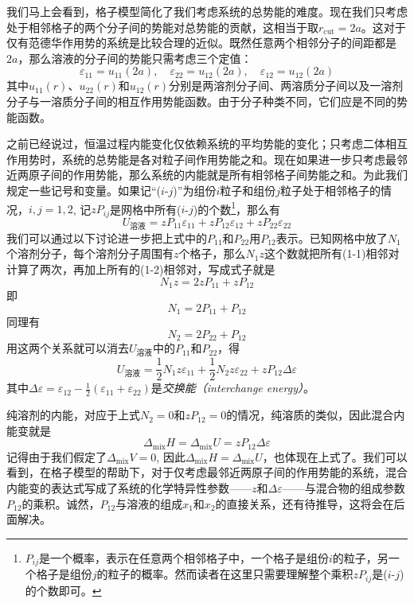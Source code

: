 \documentclass[main.tex]{subfiles}
\begin{document}
我们马上会看到，格子模型简化了我们考虑系统的总势能的难度。现在我们只考虑处于相邻格子的两个分子间的势能对总势能的贡献，这相当于取$r_\text{cut}=2a$。这对于仅有范德华作用势的系统是比较合理的近似。既然任意两个相邻分子的间距都是$2a$，那么溶液的分子间的势能只需考虑三个定值：
\[\varepsilon_{11}=u_{11}\left(2a\right),\quad\varepsilon_{22}=u_{12}\left(2a\right),\quad\varepsilon_{12}=u_{12}\left(2a\right)\]
其中$u_{11}\left(r\right)$、$u_{22}\left(r\right)$和$u_{12}\left(r\right)$分别是两溶剂分子间、两溶质分子间以及一溶剂分子与一溶质分子间的相互作用势能函数。由于分子种类不同，它们应是不同的势能函数。

之前已经说过，恒温过程内能变化仅依赖系统的平均势能的变化；只考虑二体相互作用势时，系统的总势能是各对粒子间作用势能之和。现在如果进一步只考虑最邻近两原子间的作用势能，那么系统的内能就是所有相邻格子间势能之和。为此我们规定一些记号和变量。如果记“($i$-$j$)”为组份$i$粒子和组份$j$粒子处于相邻格子的情况，$i,j=1,2$, 记$z P_{ij}$是网格中所有($i$-$j$)的个数\footnote{$P_{ij}$是一个概率，表示在任意两个相邻格子中，一个格子是组份$i$的粒子，另一个格子是组份$j$的粒子的概率。然而读者在这里只需要理解整个乘积$z P_{ij}$是($i$-$j$)的个数即可。}，那么有
\[U_\text{溶液}=zP_{11}\varepsilon_{11}+zP_{12}\varepsilon_{12}+zP_{22}\varepsilon_{22}\]
我们可以通过以下讨论进一步把上式中的$P_{11}$和$P_{22}$用$P_{12}$表示。已知网格中放了$N_1$个溶剂分子，每个溶剂分子周围有$z$个格子，那么$N_1 z$这个数就把所有(1-1)相邻对计算了两次，再加上所有的(1-2)相邻对，写成式子就是
\[N_1z=2zP_{11}+zP_{12}\]
即
\[N_1=2P_{11}+P_{12}\]
同理有
\[N_2=2P_{22}+P_{12}\]
用这两个关系就可以消去$U_\text{溶液}$中的$P_{11}$和$P_{22}$，得
\[
  U_\text{溶液}=\frac{1}{2}N_1z\varepsilon_{11}+\frac{1}{2}N_2z\varepsilon_{22}+zP_{12}\Delta\varepsilon
\]
其中$\Delta\varepsilon=\varepsilon_{12}-\frac{1}{2}\left(\varepsilon_{11}+\varepsilon_{22}\right)$是\emph{交换能（interchange energy）}。

纯溶剂的内能，对应于上式$N_2=0$和$zP_{12}=0$的情况，纯溶质的类似，因此混合内能变就是
\begin{equation}\label{eq:III.1_mixing_internal_energy_regular_solution}
  \Delta_\text{mix}H=\Delta_\text{mix}U=zP_{12}\Delta\varepsilon
\end{equation}
记得由于我们假定了$\Delta_\text{mix} V=0$, 因此$\Delta_\text{mix}H=\Delta_\text{mix}U$，也体现在上式了。我们可以看到，在格子模型的帮助下，对于仅考虑最邻近两原子间的作用势能的系统，混合内能变的表达式写成了系统的化学特异性参数——$z$和$\Delta\varepsilon$——与混合物的组成参数$P_{12}$的乘积。诚然，$P_{12}$与溶液的组成$x_1$和$x_2$的直接关系，还有待推导，这将会在后面解决。
\end{document}
